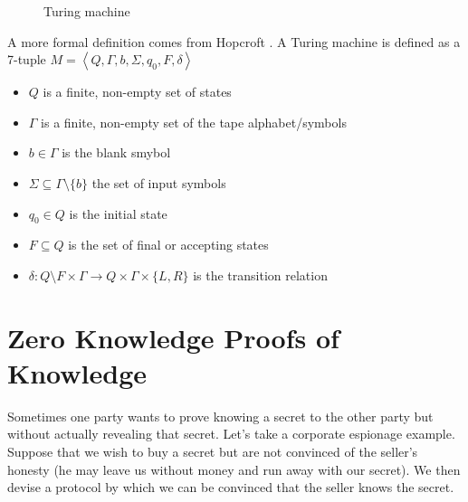 \begin{figure}[hbt!]
\centering
{}
\caption{Turing machine}
\label{fig:turing}
\end{figure}

A more formal definition comes from Hopcroft \cite{Hopcroft}. A Turing machine
is defined as a 7-tuple $M = \left< Q, \Gamma, b, \Sigma, q_0, F, \delta \right>$
\begin{itemize}
\item $Q$ is a finite, non-empty set of states
\item $\Gamma$ is a finite, non-empty set of the tape alphabet/symbols
\item $b \in \Gamma$ is the blank smybol
\item $\Sigma \subseteq \Gamma \setminus \{ b \}$ the set of input symbols
\item $q_0 \in Q$ is the initial state
\item $F \subseteq Q$ is the set of final or accepting states
\item $\delta : Q \setminus F \times \Gamma \rightarrow Q \times \Gamma \times \{ L,R \}$ is the transition relation
\end{itemize}

\section{Zero Knowledge Proofs of Knowledge}

Sometimes one party wants to prove knowing a secret to the other party
but without actually revealing that secret. Let's take a corporate
espionage example. Suppose that we wish to buy a secret but are not
convinced of the seller's honesty (he may leave us without money and
run away with our secret). We then devise a protocol by which we can
be convinced that the seller knows the secret.

\filbreak

